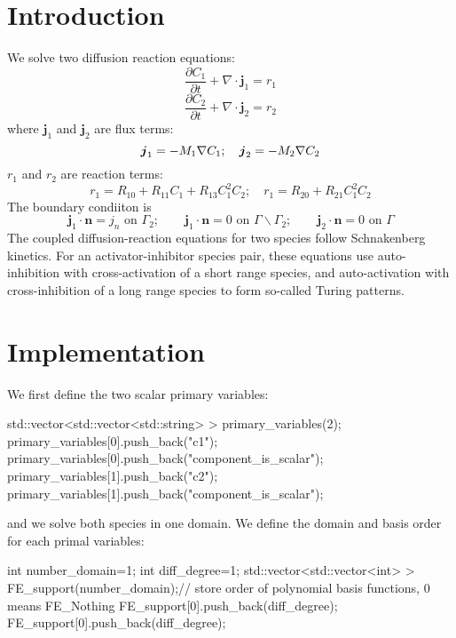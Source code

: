 \hypertarget{growth_Introduction}{}\section{Introduction}\label{growth_Introduction}
We solve two diffusion reaction equations\-: \[ \frac{\partial C_\text{1}}{\partial t}+\nabla\cdot\boldsymbol{j}_1=r_1 \] \[ \frac{\partial C_\text{2}}{\partial t}+\nabla\cdot\boldsymbol{j}_2=r_2 \] where $\boldsymbol{j}_1 $ and $\boldsymbol{j}_2 $ are flux terms\-: \[ \boldsymbol{j}_1=-M_1\nabla C_\text{1}; \quad \boldsymbol{j}_2=-M_2\nabla C_\text{2}\\ \] $r_1$ and $r_2$ are reaction terms\-: \[ r_1= R_{10}+R_{11}C_1+R_{13}C_1^2C_2; \quad r_1= R_{20}+R_{21}C_1^2C_2 \] The boundary condiiton is \[ \boldsymbol{j}_1\cdot\boldsymbol{n}=j_n \text{ on }\Gamma_2;\quad \quad \boldsymbol{j}_1\cdot\boldsymbol{n}=0 \text{ on }\Gamma \backslash \Gamma_2; \quad \quad \boldsymbol{j}_2\cdot\boldsymbol{n}=0 \text{ on }\Gamma \] The coupled diffusion-\/reaction equations for two species follow Schnakenberg kinetics. For an activator-\/inhibitor species pair, these equations use auto-\/inhibition with cross-\/activation of a short range species, and auto-\/activation with cross-\/inhibition of a long range species to form so-\/called Turing patterns.\hypertarget{growth_imple}{}\section{Implementation}\label{growth_imple}
We first define the two scalar primary variables\-: 
\begin{DoxyCode}
std::vector<std::vector<std::string> > primary\_variables(2);        
      primary\_variables[0].push\_back(\textcolor{stringliteral}{"c1"}); primary\_variables[0].push\_back(\textcolor{stringliteral}{"component\_is\_scalar"});
      primary\_variables[1].push\_back(\textcolor{stringliteral}{"c2"}); primary\_variables[1].push\_back(\textcolor{stringliteral}{"component\_is\_scalar"});
\end{DoxyCode}
 and we solve both species in one domain. We define the domain and basis order for each primal variables\-: 
\begin{DoxyCode}
\textcolor{keywordtype}{int} number\_domain=1;
\textcolor{keywordtype}{int} diff\_degree=1;
std::vector<std::vector<int> > FE\_support(number\_domain);\textcolor{comment}{// store order of polynomial basis functions, 0
       means FE\_Nothing   }
FE\_support[0].push\_back(diff\_degree);
FE\_support[0].push\_back(diff\_degree);
\end{DoxyCode}
